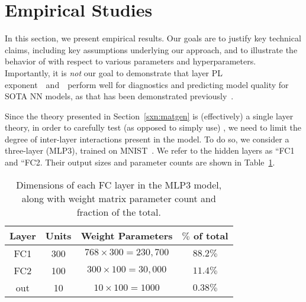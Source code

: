 \section{Empirical Studies}
\label{sxn:empirical}

In this section, we present empirical results. 
Our goals are to justify key technical claims, including key assumptions underlying our \SETOL approach, and to illustrate the behavior of \SETOL with respect to various parameters and hyperparameters.
Importantly, it is \emph{not} our goal to demonstrate that layer PL exponent~\ALPHA~and~\ALPHAHAT~perform well for diagnostics and predicting model quality for SOTA NN models, as that has been demonstrated previously~\cite{MM20a_trends_NatComm,MM21a_simpsons_TR,YTHx22_TR}.

Since the \SETOL theory presented in Section~\ref{sxn:matgen} is (effectively) a single layer theory,
in order to carefully test (as opposed to simply use) \SETOL, we need to limit the degree of inter-layer interactions present in the model.
To do so, we consider a three-layer \MultiLayerPerceptron (MLP3), trained on MNIST~\cite{MNIST1998}. 
We refer to the hidden layers as ``FC1 and ``FC2. Their output sizes and parameter counts are shown in 
Table~\ref{tab:mlp3}.

\begin{table}[h]
\begin{center}
        \begin{tabular}{| c | c | c | c |}
                \hline
                Layer & Units & Weight Parameters           & $\%$ of total \\ \hline \hline
                FC1   &   300 & $768 \times 300 = 230,700$  & $88.2\%$      \\ \hline
                FC2   &   100 & $300 \times 100 = 30,000$   & $11.4\%$      \\ \hline
                out   &    10 &  $10 \times 100 = 1000$     & $0.38\%$      \\ \hline
        \end{tabular}
\end{center}
\caption{Dimensions of each FC layer in the MLP3 model, along with weight matrix parameter count and fraction of the 
total.}
\label{tab:mlp3}
\end{table}

